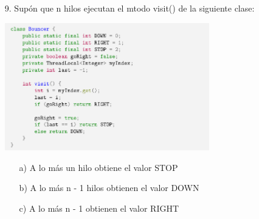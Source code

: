 \documentclass[12pt, letterpaper]{article}
\begin{document}
\begin{itemize}
\begin{itemize}
$2^{k} \rightarrow 2^{k}$ hilos y $ (2^{k}) -1 hojas$

Puede dividir el \'arbol por $2^{(k-1)}$ sub\'arboles que son id\'enticos al caso base.
Con esto obtenemos exclusión mutua, para n = k, dados los casos anteriores.(divide y conquistaras)


\item[2. ] Libre de deadlock.

El algoritmo satisface sin bloqueo.

Similar a la evidencia previa. Como el algoritmo Peterson satisface el punto muerto para el caso base.

Y el caso donde $n = k$ puede reducirse al caso base, donde tenemos varios sub\'arboles id\'enticos.

El algoritmo de bloqueo basado en \'arbol tambi\'en est\'a libre de puntos muertos.

\item[3. ] Libre del Hambruna.

El algoritmo satisface libre de hambruna.
Similar al punto anterior.
Adem\'as, establece en la declaraci\'on que un hilo puede retrasarse por un per\'iodo finito, sin embargo, un hilo no "muere".

\end{itemize}

\item[9. ]Sup\'on que n hilos ejecutan el mtodo visit() de la siguiente clase:

\begin{center}
\includegraphics[width=0.7\textwidth]{final.png}\\
\end{center}

\begin{itemize}
\item[a) ]A lo m\'as un hilo obtiene el valor STOP
\item[b) ]A lo m\'as n - 1 hilos obtienen el valor DOWN
\item[c) ]A lo m\'as n - 1 obtienen el valor RIGHT
\end{itemize}


\end{itemize}
\end{document}
